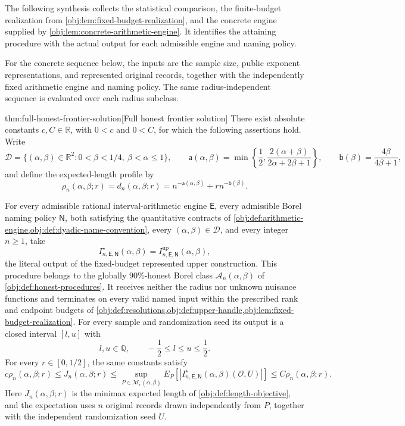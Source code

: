 \documentclass[11pt]{article}
\begin{document}
The following synthesis collects the statistical comparison, the finite-budget realization from \cref{obj:lem:fixed-budget-realization}, and the concrete engine supplied by \cref{obj:lem:concrete-arithmetic-engine}. It identifies the attaining procedure with the actual output for each admissible engine and naming policy.

For the concrete sequence below, the inputs are the sample size, public exponent representations, and represented original records, together with the independently fixed arithmetic engine and naming policy. The same radius-independent sequence is evaluated over each radius subclass.

\begin{theoremv}{thm:full-honest-frontier-solution}[Full honest frontier solution]
There exist absolute constants \(c,C\in\mathbb R\), with \(0<c\) and \(0<C\), for which the following assertions hold. Write
\[
\mathcal D=\{(\alpha,\beta)\in\mathbb R^2:0<\beta<1/4,\ \beta<\alpha\le1\},
\qquad
\mathsf a(\alpha,\beta)=
\min\left\{\frac12,\frac{2(\alpha+\beta)}{2\alpha+2\beta+1}\right\},
\qquad
\mathsf b(\beta)=\frac{4\beta}{4\beta+1},
\]
and define the expected-length profile by
\[
\rho_n(\alpha,\beta;r)
=d_n(\alpha,\beta;r)
=n^{-\mathsf a(\alpha,\beta)}
+r n^{-\mathsf b(\beta)}.
\]

For every admissible rational interval-arithmetic engine \(\mathsf E\), every admissible Borel naming policy \(\mathsf N\), both satisfying the quantitative contracts of \cref{obj:def:arithmetic-engine,obj:def:dyadic-name-convention}, every \((\alpha,\beta)\in\mathcal D\), and every integer \(n\ge1\), take
\[
I^\star_{n,\mathsf E,\mathsf N}(\alpha,\beta)
=I^{\mathrm{up}}_{n,\mathsf E,\mathsf N}(\alpha,\beta),
\]
the literal output of the fixed-budget represented upper construction. This procedure belongs to the globally \(90\%\)-honest Borel class \(\mathcal A_n(\alpha,\beta)\) of \cref{obj:def:honest-procedures}. It receives neither the radius nor unknown nuisance functions and terminates on every valid named input within the prescribed rank and endpoint budgets of \cref{obj:def:resolutions,obj:def:upper-handle,obj:lem:fixed-budget-realization}. For every sample and randomization seed its output is a closed interval \([l,u]\) with
\[
l,u\in\mathbb Q,
\qquad -\frac12\le l\le u\le\frac12.
\]
For every \(r\in[0,1/2]\), the same constants satisfy
\[
c\rho_n(\alpha,\beta;r)
\le J_n(\alpha,\beta;r)
\le
\sup_{P\in\mathcal M_r(\alpha,\beta)}
E_P\!\left[
\left|I^\star_{n,\mathsf E,\mathsf N}(\alpha,\beta)(\mathcal O,U)\right|
\right]
\le C\rho_n(\alpha,\beta;r).
\]
Here \(J_n(\alpha,\beta;r)\) is the minimax expected length of \cref{obj:def:length-objective}, and the expectation uses \(n\) original records drawn independently from \(P\), together with the independent randomization seed \(U\).


\end{theoremv}
\end{document}

